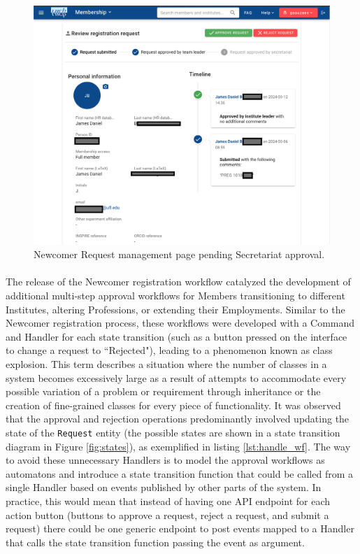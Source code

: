 \begin{figure}[H]
    \centering
    \includegraphics[width=0.65\linewidth]{figuras/wf_management_page.png}
    \caption{Newcomer Request management page pending Secretariat approval.}
    \label{fig:wf_management_page}
\end{figure}

\paragraph{} The release of the Newcomer registration workflow catalyzed the development of additional multi-step approval workflows for Members transitioning to different Institutes, altering Professions, or extending their Employments. Similar to the Newcomer registration process, these workflows were developed with a Command and Handler for each state transition (such as a button pressed on the interface to change a request to ``Rejected"), leading to a phenomenon known as class explosion. This term describes a situation where the number of classes in a system becomes excessively large as a result of attempts to accommodate every possible variation of a problem or requirement through inheritance or the creation of fine-grained classes for every piece of functionality. It was observed that the approval and rejection operations predominantly involved updating the state of the \verb|Request| entity (the possible states are shown in a state transition diagram in Figure \ref{fig:states}), as exemplified in listing \ref{lst:handle_wf}. The way to avoid these unnecessary Handlers is to model the approval workflows as automatons and introduce a state transition function that could be called from a single Handler based on events published by other parts of the system. In practice, this would mean that instead of having one API endpoint for each action button (buttons to approve a request, reject a request, and submit a request) there could be one generic endpoint to post events mapped to a Handler that calls the state transition function passing the event as argument.

